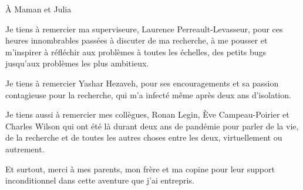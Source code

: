 \documentclass[
  normalmargins,
  11pt,
  openany,
  onehalfspacing,
]{ut-thesis}
\begin{document}
    \tableofcontents
    \listoftables
    \listoffigures
    \printglossaries
     \clearpage
    \begin{dedication}
      À Maman et Julia
    \end{dedication}
    \begin{acknowledgements}
            Je tiens à remercier ma superviseure, Laurence Perreault-Levasseur, 
            pour ces heures innombrables passées à discuter de ma recherche, à 
            me pousser et m'inspirer à réfléchir aux problèmes à toutes les échelles, des petits bugs 
            jusqu'aux problèmes les plus ambitieux.

             Je tiens à remercier Yashar Hezaveh, pour ses encouragements et 
             sa passion contagieuse pour la recherche, qui m'a infecté 
                même après deux ans d'isolation.

            Je tiens aussi à remercier mes collègues, Ronan Legin, Ève Campeau-Poirier et Charles Wilson 
            qui ont été là durant deux ans de pandémie pour parler de la vie, de la recherche 
            et de toutes les autres choses entre les deux, virtuellement ou autrement.
        
            Et surtout, merci à mes parents, mon frère et ma copine pour leur support inconditionnel 
            dans cette aventure que j'ai entrepris.
            
    \end{acknowledgements}
  \mainmatter
  
  
  
  {\scriptsize
    
  }
  \appendix
  
  
  
  \glsaddall
\end{document}
